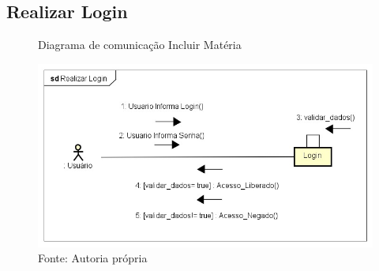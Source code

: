 \documentclass{utfpr-pg}
\begin{document}
    \subsection{Realizar Login}
        \begin{figure}[H]
            \centering
            \captionsetup{width=0.9\textwidth}
            \caption{Diagrama de comunicação Incluir Matéria}
            \includegraphics[width=0.95\linewidth]{fotos/com11.jpg}
            \caption*{Fonte: Autoria própria}
            \label{fig:Diagrama de Classes}
        \end{figure}


\end{document}
